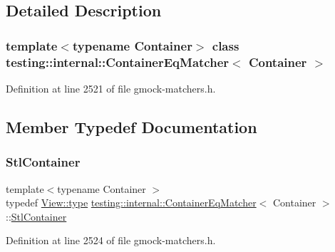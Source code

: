 \subsection{Detailed Description}
\subsubsection*{template$<$typename Container$>$\newline
class testing\+::internal\+::\+Container\+Eq\+Matcher$<$ Container $>$}



Definition at line 2521 of file gmock-\/matchers.\+h.



\subsection{Member Typedef Documentation}
\mbox{\label{classtesting_1_1internal_1_1ContainerEqMatcher_a8352d0190c372578d9a9a8457e0810db}} 
\subsubsection{\texorpdfstring{Stl\+Container}{StlContainer}}
{\footnotesize\ttfamily template$<$typename Container $>$ \\
typedef \hyperlink{classtesting_1_1internal_1_1StlContainerView_a2b2c63a6dcdbfe63fb0ee121ebf463ba}{View\+::type} \hyperlink{classtesting_1_1internal_1_1ContainerEqMatcher}{testing\+::internal\+::\+Container\+Eq\+Matcher}$<$ Container $>$\+::\hyperlink{classtesting_1_1internal_1_1ContainerEqMatcher_a8352d0190c372578d9a9a8457e0810db}{Stl\+Container}}



Definition at line 2524 of file gmock-\/matchers.\+h.

\mbox{\label{classtesting_1_1internal_1_1ContainerEqMatcher_aaaeaacf0c557fe701a83e108d47edb23}} 
